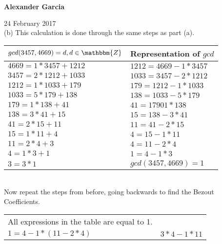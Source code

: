 \documentclass[11pt]{article}
\begin{document}
\begin{enumerate}
		\newpage

		\textbf{Alexander Garcia}

		24 February 2017 \\

		(b) This calculation is done through the same steps as part (a).
		
		\begin{tabular}{ll}
			$gcd(3457, 4669) = d, d \in \mathbbm{Z}$ & Representation of $gcd$ \\

			\hline

			$4669 = 1 * 3457 + 1212$ & $1212 = 4669 - 1 * 3457$ \\

			$3457 = 2 * 1212 + 1033$ & $1033 = 3457 - 2 * 1212$ \\

			$1212 = 1 * 1033 + 179$ & $179 = 1212 - 1 * 1033$ \\

			$1033 = 5 * 179 + 138$ & $138 = 1033 - 5 * 179$ \\

			$179 = 1 * 138 + 41$ & $41 = 179 0 1 * 138$ \\

			$138 = 3 * 41 + 15$ & $15 = 138 - 3 * 41$ \\

			$41 = 2 * 15 + 11$ & $11 = 41 - 2 * 15$ \\

			$15 = 1 * 11 + 4$ & $4 = 15 - 1 * 11$ \\

			$11 = 2 * 4 + 3$ & $4 = 11 - 2 * 4$ \\

			$4 = 1 * 3 + 1$ & $1 = 4 - 1 * 3$ \\

			$3 = 3 * 1$ & $gcd(3457, 4669) = 1$ \\
			
		\end{tabular}\\

		Now repeat the steps from before, going backwards to find the Bezout Coefficients.

		\begin{tabular}{ll}

			All expressions in the table are equal to 1. \\

			$1 = 4 - 1 * (11 - 2 * 4)$ & $3 * 4 - 1 * 11$ \\


\end{tabular}
\end{enumerate}
\end{document}
